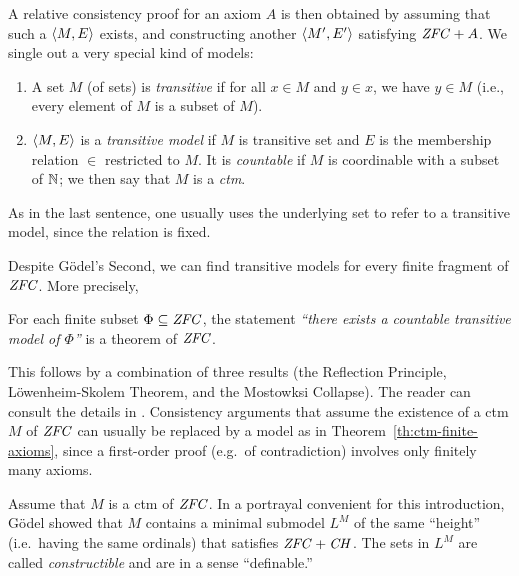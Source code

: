 A relative consistency proof for an axiom $A$ is then obtained by assuming that such a
$\langle M,E\rangle$ exists, and constructing another $\langle M',E'\rangle$
satisfying $\mathit{ZFC} + A$. We single out a very special kind of models:
%
\begin{definition}\label{def:transitive-model}
  \begin{enumerate}
  \item A set $M$ (of sets) is \emph{transitive} if for all $x\in M$ and 
    $y\in x$, we have $y\in M$ (i.e., every element of $M$ is a subset
    of $M$).
  \item $\langle M,E\rangle$ is a \emph{transitive model} if $M$ is transitive
    set and  $E$ is the membership relation $\in$ restricted to
    $M$. It is \emph{countable} if $M$ is coordinable with a subset of
    $\mathbb{N}$; we then say that $M$ is a \emph{ctm}. 
  \end{enumerate}
\end{definition}
%
As in the last sentence, one usually uses the underlying set to refer to a transitive
model, since the relation is fixed. 

Despite G\"odel's Second, we can find transitive models for every
finite fragment of $\mathit{ZFC}$. More precisely, 
%
\begin{theorem}\label{th:ctm-finite-axioms}
  For each finite subset
  $\Phi\subseteq \mathit{ZFC}$, the statement \emph{``there exists a countable
    transitive model of $\Phi$''} is a theorem of $\mathit{ZFC}$.
\end{theorem}
%
This follows by a
combination of three results (the Reflection Principle,
L\"owenheim-Skolem Theorem, and the Mostowksi Collapse). The reader
can consult the details in \cite{kunen2011set}. Consistency arguments that assume
the existence of a ctm $M$ of $\mathit{ZFC}$ can usually be replaced by a
model as in Theorem~\ref{th:ctm-finite-axioms}, since a first-order
proof (e.g.\ of contradiction) involves only finitely many axioms.

Assume that $M$ is a ctm of $\mathit{ZFC}$. In a portrayal convenient for this
introduction, G\"odel showed that $M$ contains a minimal submodel
$L^M$ of the same ``height'' (i.e.\ having the same ordinals)
that satisfies $\mathit{ZFC}+\mathit{CH}$. The sets in $L^M$ are called
\emph{constructible} and are in a sense ``definable.''

